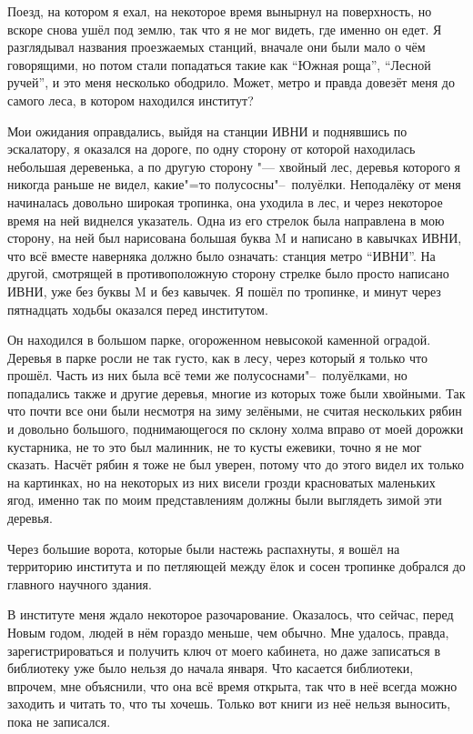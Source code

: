 Поезд, на котором я ехал, на некоторое время вынырнул на поверхность, но вскоре
снова ушёл под землю, так что я не мог видеть, где именно он едет.
Я разглядывал названия проезжаемых станций, вначале они были мало о чём
говорящими, но потом стали попадаться такие как \enquote{Южная роща},
\enquote{Лесной ручей}, и это меня несколько ободрило.
Может, метро и правда довезёт меня до самого леса, в котором находился институт?

Мои ожидания оправдались, выйдя на станции ИВНИ и поднявшись по эскалатору, я
оказался на дороге, по одну сторону от которой находилась небольшая деревенька,
а по другую сторону "--- хвойный лес, деревья которого я никогда раньше не
видел, какие"=то полусосны"--~полуёлки.
Неподалёку от меня начиналась довольно широкая тропинка, она уходила в лес, и
через некоторое время на ней виднелся указатель.
Одна из его стрелок была направлена в мою сторону, на ней был нарисована большая
буква M и написано в кавычках ИВНИ, что всё вместе наверняка должно было
означать: станция метро \enquote{ИВНИ}.
На другой, смотрящей в противоположную сторону стрелке было просто написано
ИВНИ, уже без буквы M и без кавычек.
Я пошёл по тропинке, и минут через пятнадцать ходьбы оказался перед институтом.

Он находился в большом парке, огороженном невысокой каменной оградой.
Деревья в парке росли не так густо, как в лесу, через который я только что
прошёл.
Часть из них была всё теми же полусоснами"--~полуёлками, но попадались также и
другие деревья, многие из которых тоже были хвойными.
Так что почти все они были несмотря на зиму зелёными, не считая нескольких рябин
и довольно большого, поднимающегося по склону холма вправо от моей дорожки
кустарника, не то это был малинник, не то кусты ежевики, точно я не мог сказать.
Насчёт рябин я тоже не был уверен, потому что до этого видел их только на
картинках, но на некоторых из них висели грозди красноватых маленьких ягод,
именно так по моим представлениям должны были выглядеть зимой эти деревья.

Через большие ворота, которые были настежь распахнуты, я вошёл на территорию
института и по петляющей между ёлок и сосен тропинке добрался до главного
научного здания.

В институте меня ждало некоторое разочарование.
Оказалось, что сейчас, перед Новым годом, людей в нём гораздо меньше, чем
обычно.
Мне удалось, правда, зарегистрироваться и получить ключ от моего кабинета, но
даже записаться в библиотеку уже было нельзя до начала января.
Что касается библиотеки, впрочем, мне объяснили, что она всё время открыта, так
что в неё всегда можно заходить и читать то, что ты хочешь.
Только вот книги из неё нельзя выносить, пока не записался.

